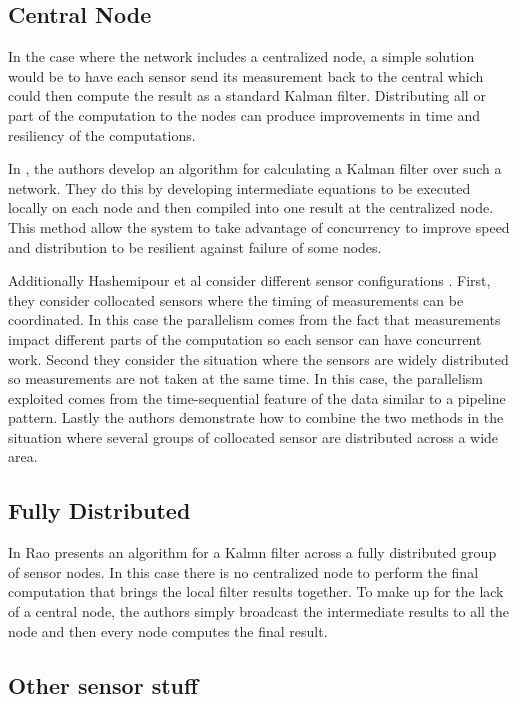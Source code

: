 \documentclass[11pt]{article}
\begin{document}
\subsection{Central Node}
In the case where the network includes a centralized node, a simple solution would be to have each sensor send its measurement back to the central which could then compute the result as a standard Kalman filter. Distributing all or part of the computation to the nodes can produce improvements in time and resiliency of the computations. 

In \cite{hashemipour1988decentralized}, the authors develop an algorithm for calculating a Kalman filter over such a network. They do this by developing intermediate equations to be executed locally on each node and then compiled into one result at the centralized node. This method allow the system to take advantage of concurrency to improve speed and distribution to be resilient against failure of some nodes. 

Additionally Hashemipour et al consider different sensor configurations . First, they consider collocated sensors where the timing of measurements can be coordinated. In this case the parallelism comes from the fact that measurements impact different parts of the computation so each sensor can have concurrent work. Second they consider the situation where the sensors are widely distributed so measurements are not taken at the same time. In this case, the parallelism exploited comes from the time-sequential feature of the data similar to a pipeline pattern. Lastly the authors demonstrate how to combine the two methods in the situation where several groups of collocated sensor are distributed across a wide area.

\subsection{Fully Distributed}
In \cite{rao1991fully} Rao presents an algorithm for a Kalmn filter across a fully distributed group of sensor nodes. In this case there is no centralized node to perform the final computation that brings the local filter results together. To make up for the lack of a central node, the authors simply broadcast the intermediate results to all the node and then every node computes the final result.


\subsection{Other sensor stuff}
\cite{spanos2005distributed,spanos2005approximate}
\end{document}
